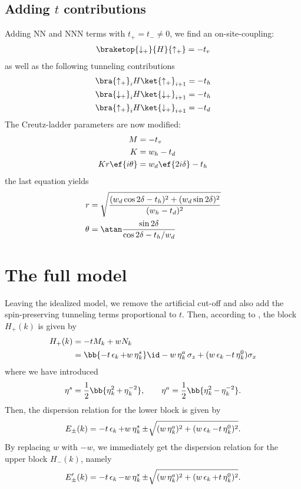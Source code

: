 \subsection{Adding $t$ contributions}
Adding NN and NNN terms with $t_+=t_-\ne 0$, we find an on-site-coupling:
\begin{align}
    \braketop{\downarrow_+}{H}{\uparrow_+} = -t_v
\end{align}
as well as the following tunneling contributions
\begin{align}
    \bra{\uparrow_+}_{i}H\ket{\uparrow_+}_{i+1} &= -t_h \\
    \bra{\downarrow_+}_{i}H\ket{\downarrow_+}_{i+1} &= -t_h \\
    \bra{\uparrow_+}_{i}H\ket{\downarrow_+}_{i+1} &= -t_d
\end{align}
The Creutz-ladder parameters are now modified:
\begin{align}
    M &= -t_v \\
    K &= w_h - t_d\\
    K r \ef{i \theta} &= w_d \ef{2i\delta} - t_h
\end{align}
the last equation yields
\begin{align}
    r &= \sqrt{\frac{(w_d\cos 2\delta - t_h)^2 + (w_d \sin 2\delta)^2}{(w_h-t_d)^2}} \\
    \theta &= \atan \frac{\sin 2\delta}{\cos 2\delta-t_h/w_d}
\end{align}


\section{The full model}
Leaving the idealized model, we remove the artificial cut-off and also add the spin-preserving tunneling terms proportional to $t$.
Then, according to , the block $H_+(k)$ is given by
\begin{align}
    H_+(k) &= -t M_k + w N_k \\
           &= \bb{-t \ep_k + w \et^{s}_k} \id - w\et^{a}_k \sigma_z + (w \ep_k - t \et^0_k) \sigma_x
\end{align}
where we have introduced
\begin{align}
    \et^s = \frac{1}{2} \bb{ \et^2_k + \et^{-2}_{k} }, \qquad
    \et^a = \frac{1}{2} \bb{ \et^2_k - \et^{-2}_{k} }.
\end{align}
Then, the dispersion relation for the lower block is given by
\begin{align}
    E_\pm(k) = -t \operatorname{\epsilon}_k + w \operatorname{\eta}^s_k \pm \sqrt{(w \operatorname{\eta}^a_k)^2+(w \operatorname{\epsilon}_k - t \operatorname{\eta}^0_k)^2}.
\end{align}
By replacing $w$ with $-w$, we immediately get the dispersion relation for the upper block $H_-(k)$, namely
\begin{align}
    E'_\pm(k) = -t \operatorname{\epsilon}_k - w \operatorname{\eta}^s_k \pm \sqrt{(w \operatorname{\eta}^a_k)^2+(w \operatorname{\epsilon}_k + t \operatorname{\eta}^0_k)^2}.
\end{align}

